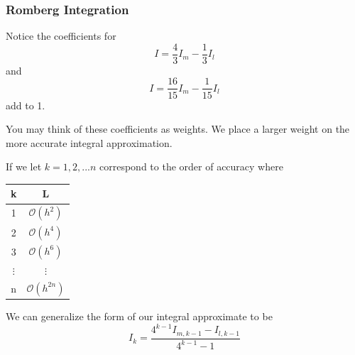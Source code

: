 \documentclass{if-beamer}
\begin{document}
\begin{frame}[t]
	\frametitle{Romberg Integration}
	Notice the coefficients for
	$$ I = \frac{4}{3}I_m -\frac{1}{3}I_l$$
	and
	$$ I = \frac{16}{15}I_m -\frac{1}{15}I_l$$
	add to 1. \\\vspace{10pt}
	
	You may think of these coefficients as weights. We place a larger weight on the more accurate integral approximation. \\\vspace{10pt}
	
	If we let $k = 1,2,...n$ correspond to the order of accuracy where \\
	\begin{minipage}{0.3\textwidth}
		\begin{table}
			\begin{tabular}{c | c }
				k & L\\
				\hline
				1 & $\mathcal{O}(h^2)$ \\
				2 & $\mathcal{O}(h^4)$ \\
				3 & $\mathcal{O}(h^6)$ \\
				$\vdots$ & $\vdots$ \\
				n & $\mathcal{O}(h^{2n})$ \\
			\end{tabular}
		\end{table}
	\end{minipage}
	\begin{minipage}{0.7\textwidth}
		We can generalize the form of our integral approximate to be\\	
		$$ I_k = \frac{4^{k-1}I_{m, k-1}-I_{l,k-1}}{4^{k-1}-1}$$	
	\end{minipage}
\end{frame}
\end{document}
